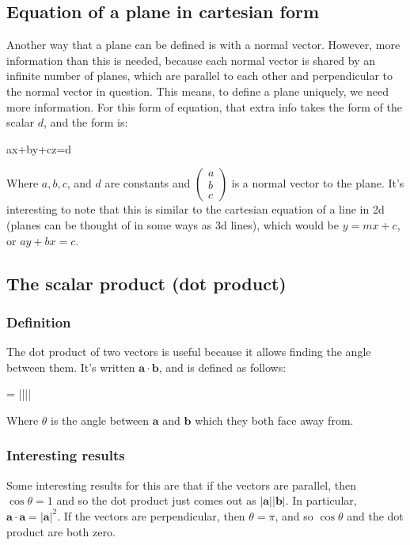 \subsection{Equation of a plane in cartesian form}
Another way that a plane can be defined is with a normal vector. However, more information than this is needed, because each normal vector is shared by an infinite number of planes, which are parallel to each other and perpendicular to the normal vector in question. This means, to define a plane uniquely, we need more information. For this form of equation, that extra info takes the form of the scalar $d$, and the form is:

\begin{ea}
	ax+by+cz=d
\end{ea}

Where $a, b, c$, and $d$ are constants and $\begin{pmatrix}a\\b\\c\end{pmatrix}$ is a normal vector to the plane. It's interesting to note that this is similar to the cartesian equation of a line in 2d (planes can be thought of in some ways as 3d lines), which would be $y=mx+c$, or $ay+bx=c$.

\subsection{The scalar product (dot product)}
\subsubsection{Definition}
The dot product of two vectors is useful because it allows finding the angle between them. It's written $\mathbf{a} \cdot \mathbf{b}$, and is defined as follows:
\begin{ea}
	 \cdot {} = ||||\cos\theta
\end{ea}
Where $\theta$ is the angle between $\mathbf{a}$ and $\mathbf{b}$ which they both face away from.

\subsubsection{Interesting results}
Some interesting results for this are that if the vectors are parallel, then $\cos\theta=1$ and so the dot product just comes out as $|\mathbf{a}||\mathbf{b}|$. In particular, $\mathbf{a} \cdot \mathbf{a} = |\mathbf{a}|^2$. If the vectors are perpendicular, then $\theta=\pi$, and so $\cos\theta$ and the dot product are both zero.

